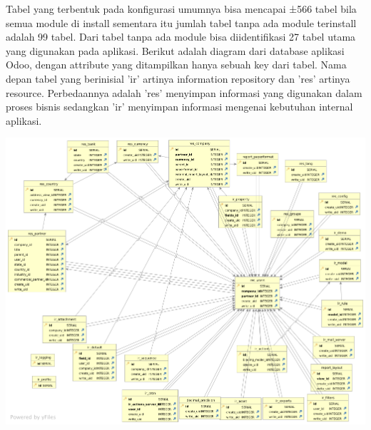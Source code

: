 Tabel yang terbentuk pada konfigurasi umumnya bisa mencapai ±566 tabel bila semua module di install sementara itu jumlah tabel tanpa ada module terinstall adalah 99 tabel. Dari tabel tanpa ada module bisa diidentifikasi 27 tabel utama yang digunakan pada aplikasi. Berikut adalah diagram dari database aplikasi Odoo, dengan attribute yang ditampilkan hanya sebuah key dari tabel. Nama depan tabel yang berinisial 'ir' artinya information repository dan 'res' artinya resource. Perbedaannya adalah 'res' menyimpan informasi yang digunakan dalam proses bisnis sedangkan 'ir' menyimpan informasi mengenai kebutuhan internal aplikasi.
 
\begin{center}
	\includegraphics[width=14cm]{img/OdooCoreERD.png}
	\label{fig:asd}
\end{center}



